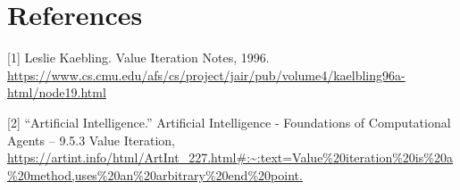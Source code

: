 \documentclass[11pt]{article}
\begin{document}
\section*{References}
[1] Leslie Kaebling. Value Iteration Notes, 1996. \url{https://www.cs.cmu.edu/afs/cs/project/jair/pub/volume4/kaelbling96a-html/node19.html}

[2] “Artificial Intelligence.” Artificial Intelligence - Foundations of Computational Agents -- 9.5.3 Value Iteration, \url{https://artint.info/html/ArtInt_227.html#:~:text=Value\%20iteration\%20is\%20a\%20method,uses\%20an\%20arbitrary\%20end\%20point.}
{


}


\end{document}
